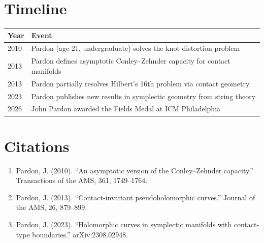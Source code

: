 \section{Timeline}

\begin{tabularx}{\linewidth}{lX}
\toprule
\textbf{Year} & \textbf{Event} \\ \midrule
2010 & Pardon (age 21, undergraduate) solves the knot distortion problem \\
2013 & Pardon defines asymptotic Conley--Zehnder capacity for contact manifolds \\
2013 & Pardon partially resolves Hilbert's 16th problem via contact geometry \\
2023 & Pardon publishes new results in symplectic geometry from string theory \\
2026 & John Pardon awarded the Fields Medal at ICM Philadelphia \\
\bottomrule
\end{tabularx}

\section{Citations}

\begin{enumerate}
\item Pardon, J. (2010). ``An asymptotic version of the Conley--Zehnder capacity.'' Transactions of the AMS, 361, 1749--1764.
\item Pardon, J. (2013). ``Contact-invariant pseudoholomorphic curves.'' Journal of the AMS, 26, 879--899.
\item Pardon, J. (2023). ``Holomorphic curves in symplectic manifolds with contact-type boundaries.'' arXiv:2308.02948.
\end{enumerate}
